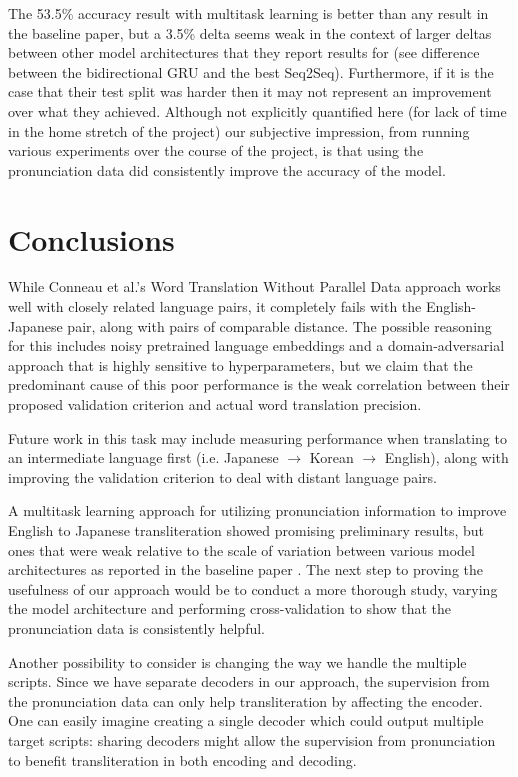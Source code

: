 \documentclass{article}
\begin{document}
The 53.5\% accuracy result with multitask learning
is better than any result in the baseline paper,
but a 3.5\% delta seems weak
in the context of larger deltas between other model architectures
that they report results for
(see difference between the bidirectional GRU and the best Seq2Seq).
Furthermore,
if it is the case that their test split was harder
then it may not represent an improvement over what they achieved.
Although not explicitly quantified here
(for lack of time in the home stretch of the project)
our subjective impression,
from running various experiments over the course of the project,
is that using the pronunciation data
did consistently improve the accuracy of the model.

\section*{Conclusions}

While Conneau et al.'s Word Translation Without Parallel Data approach
works well with closely related language pairs, it completely fails
with the English-Japanese pair, along with pairs of comparable distance.
The possible reasoning for this includes noisy pretrained language
embeddings and a domain-adversarial approach that is highly sensitive
to hyperparameters, but we claim that the predominant cause of this
poor performance is the weak correlation between their proposed
validation criterion and actual word translation precision.

Future work in this task may include measuring performance when translating
to an intermediate language first (i.e. Japanese $\rightarrow$ Korean
$\rightarrow$ English), along with improving the validation criterion to
deal with distant language pairs.

A multitask learning approach for utilizing pronunciation information
to improve English to Japanese transliteration
showed promising preliminary results,
but ones that were weak relative to the scale of variation
between various model architectures as reported
in the baseline paper \cite{Rosca2016SequencetosequenceNN}.
The next step to proving the usefulness of our approach
would be to conduct a more thorough study,
varying the model architecture and performing cross-validation
to show that the pronunciation data is consistently helpful.

Another possibility to consider
is changing the way we handle the multiple scripts.
Since we have separate decoders in our approach,
the supervision from the pronunciation data
can only help transliteration by affecting the encoder.
One can easily imagine creating a single decoder
which could output multiple target scripts:
sharing decoders might allow the supervision from pronunciation
to benefit transliteration in both encoding and decoding.
\end{document}
